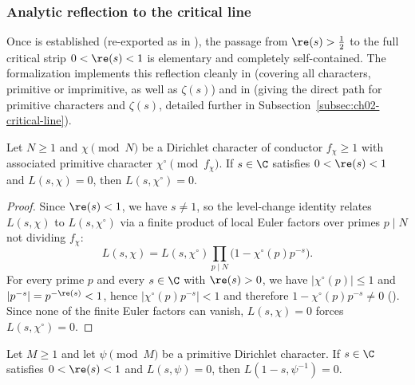 \subsubsection{Analytic reflection to the critical line}

Once  is established (re-exported as
 in ), the passage
from $\re(s) > \tfrac{1}{2}$ to the full critical strip $0 < \re(s) < 1$ is
elementary and completely self-contained.
The formalization implements this reflection cleanly in
 (covering
all characters, primitive or imprimitive, as well as $\zeta(s)$) and in
 (giving the direct path
for primitive characters and $\zeta(s)$, detailed further in
Subsection~\ref{subsec:ch02-critical-line}).

\begin{lemma}
\label{lem:ch01-prim-zero}
Let $N \ge 1$ and $\chi \pmod{N}$ be a Dirichlet character of conductor
$f_{\chi} \ge 1$ with associated primitive character $\chi^{\circ} \pmod{f_{\chi}}$.
If $s \in \C$ satisfies $0 < \re(s) < 1$ and $L(s, \chi) = 0$, then
$L(s, \chi^{\circ}) = 0$.
\end{lemma}

\begin{proof}
Since $\re(s) < 1$, we have $s \neq 1$, so the level-change identity relates
$L(s, \chi)$ to $L(s, \chi^{\circ})$ via a finite product of local Euler
factors over primes $p \mid N$ not dividing $f_{\chi}$:
\[
  L(s, \chi) = L(s, \chi^{\circ}) \prod_{p \mid N} \bigl(1 - \chi^{\circ}(p) p^{-s}\bigr).
\]
For every prime $p$ and every $s \in \C$ with $\re(s) > 0$, we have
$|\chi^{\circ}(p)| \le 1$ and $|p^{-s}| = p^{-\re(s)} < 1$, hence
$|\chi^{\circ}(p) p^{-s}| < 1$ and therefore $1 - \chi^{\circ}(p) p^{-s} \neq 0$
().
Since none of the finite Euler factors can vanish, $L(s, \chi) = 0$ forces
$L(s, \chi^{\circ}) = 0$.
\end{proof}

\begin{lemma}
\label{lem:ch01-prim-reflect}
Let $M \ge 1$ and let $\psi \pmod{M}$ be a primitive Dirichlet character.
If $s \in \C$ satisfies $0 < \re(s) < 1$ and $L(s, \psi) = 0$, then
$L(1 - s, \psi^{-1}) = 0$.
\end{lemma}

